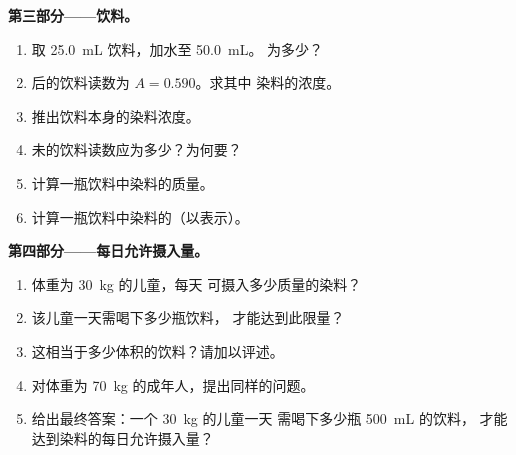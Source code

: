\begin{problem}
\medskip
\noindent\textbf{第三部分——饮料。}
\begin{enumerate}[resume]
  \item 取 \qty{25.0}{mL} 饮料，加水至 \qty{50.0}{mL}。
        为多少？
  \item {}后的饮料读数为 $A = 0.590$。求其中
        染料的浓度。
  \item 推出饮料本身的染料浓度。
  \item 未的饮料读数应为多少？为何要？
  \item 计算一瓶饮料中染料的质量。
  \item 计算一瓶饮料中染料的（以表示）。
\end{enumerate}

\medskip
\noindent\textbf{第四部分——每日允许摄入量。}
\begin{enumerate}[resume]
  \item 体重为 \qty{30}{kg} 的儿童，每天
        可摄入多少质量的染料？
  \item 该儿童一天需喝下多少瓶饮料，
        才能达到此限量？
  \item 这相当于多少体积的饮料？请加以评述。
  \item 对体重为 \qty{70}{kg} 的成年人，提出同样的问题。
  \item 给出最终答案：一个 \qty{30}{kg} 的儿童一天
        需喝下多少瓶 \qty{500}{mL} 的饮料，
        才能达到染料的每日允许摄入量？
\end{enumerate}
\end{problem}
